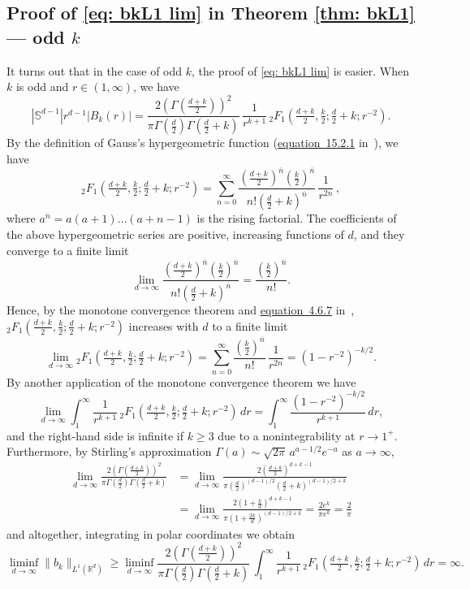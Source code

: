 \documentclass[a4paper,12pt,reqno]{amsart}
\numberwithin{equation}{section}
\theoremstyle{definition}
\newcommand{\R}{\mathbb{R}}
\newcommand{\sph}{\mathbb{S}}
\renewcommand{\ge}{\geqslant}
\begin{document}
\subsection{Proof of \texorpdfstring{\eqref{eq: bkL1 lim}}{(\ref*{eq: bkL1 lim})} in Theorem \texorpdfstring{\ref{thm: bkL1}}{\ref*{thm: bkL1}} --- odd \texorpdfstring{$k$}{k}}
It turns out that in the case of odd $k$, the proof of \eqref{eq: bkL1 lim} is easier. When $k$ is odd and $r \in (1, \infty)$, we have
\[
|\sph^{d - 1}| r^{d - 1} |B_k(r)| = \frac{2 (\Gamma(\frac{d + k}{2}))^2}{\pi \Gamma(\frac{d}{2}) \Gamma(\frac{d}{2} + k)} \, \frac{1}{r^{k + 1}} \, {_2F_1}(\tfrac{d + k}{2}, \tfrac{k}{2}; \tfrac{d}{2} + k; r^{-2}) .
\]
By the definition of Gauss's hypergeometric function (\href{https://dlmf.nist.gov/15.2#E1}{equation~15.2.1} in~\cite{dlmf}), we have
\[
 {_2F_1}(\tfrac{d + k}{2}, \tfrac{k}{2}; \tfrac{d}{2} + k; r^{-2}) = \sum_{n = 0}^\infty \frac{(\frac{d + k}{2})^{\overline{n}} (\frac{k}{2})^{\overline{n}}}{n! (\frac{d}{2} + k)^{\overline{n}}} \, \frac{1}{r^{2 n}} \, ,
\]
where $a^{\overline{n}} = a (a + 1) \dots (a + n - 1)$ is the rising factorial. The coefficients of the above hypergeometric series are positive, increasing functions of $d$, and they converge to a finite limit
\[
 \lim_{d \to \infty} \frac{(\frac{d + k}{2})^{\overline{n}} (\frac{k}{2})^{\overline{n}}}{n! (\frac{d}{2} + k)^{\overline{n}}} = \frac{(\frac{k}{2})^{\overline{n}}}{n!} .
\]
Hence, by the monotone convergence theorem and \href{https://dlmf.nist.gov/4.6.E7}{equation~4.6.7} in~\cite{dlmf}, ${_2F_1}(\tfrac{d + k}{2}, \tfrac{k}{2}; \tfrac{d}{2} + k; r^{-2})$ increases with $d$ to a finite limit
\[
 \lim_{d \to \infty} {_2F_1}(\tfrac{d + k}{2}, \tfrac{k}{2}; \tfrac{d}{2} + k; r^{-2}) = \sum_{n = 0}^\infty \frac{(\frac{k}{2})^{\overline{n}}}{n!} \, \frac{1}{r^{2 n}} = (1 - r^{-2})^{-k / 2} .
\]
By another application of the monotone convergence theorem we have
\[
 \lim_{d \to \infty} \int_1^\infty \frac{1}{r^{k + 1}} \, {_2F_1}(\tfrac{d + k}{2}, \tfrac{k}{2}; \tfrac{d}{2} + k; r^{-2}) \, dr = \int_1^\infty \frac{(1 - r^{-2})^{-k / 2}}{r^{k + 1}} \, dr ,
\]
and the right-hand side is infinite if $k \ge 3$ due to a nonintegrability at $r \to 1^+$. Furthermore, by Stirling's approximation $\Gamma(a) \sim \sqrt{2 \pi} \, a^{a - 1/2} e^{-a}$ as $a \to \infty$,
\begin{align*}
 \lim_{d \to \infty} \frac{2 (\Gamma(\frac{d + k}{2}))^2}{\pi \Gamma(\frac{d}{2}) \Gamma(\frac{d}{2} + k)} & = \lim_{d \to \infty} \frac{2 (\frac{d + k}{2})^{d + k - 1}}{\pi (\frac{d}{2})^{(d - 1) / 2} (\frac{d}{2} + k)^{(d - 1) / 2 + k}} \\
 &  = \lim_{d \to \infty} \frac{2 (1 + \frac{k}{d})^{d + k - 1}}{\pi (1 + \frac{2 k}{d})^{(d - 1) / 2 + k}} = \frac{2 e^k}{\pi e^k} = \frac{2}{\pi}
\end{align*}
and altogether, integrating in polar coordinates we obtain
\[
\liminf_{d\to \infty}\|b_k\|_{L^1(\R^d)}\ge \liminf_{d\to \infty} \frac{2 (\Gamma(\frac{d + k}{2}))^2}{\pi \Gamma(\frac{d}{2}) \Gamma(\frac{d}{2} + k)} \, \int_{1}^{\infty}\frac{1}{r^{k + 1}} \, {_2F_1}(\tfrac{d + k}{2}, \tfrac{k}{2}; \tfrac{d}{2} + k; r^{-2}) \,dr=\infty.
\]
\end{document}
